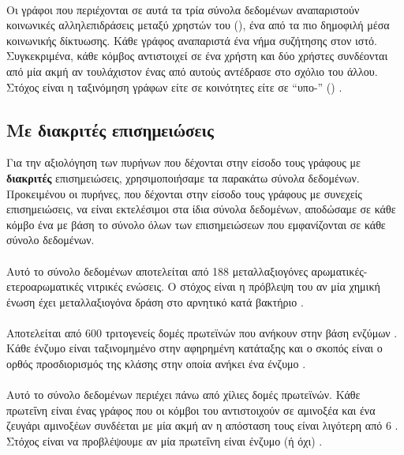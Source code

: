 \paragraph*{}
Οι γράφοι που περιέχονται σε αυτά τα τρία σύνολα δεδομένων αναπαριστούν κοινωνικές αλληλεπιδράσεις μεταξύ χρηστών του  (), ένα από τα πιο δημοφιλή μέσα κοινωνικής δίκτυωσης.
Κάθε γράφος αναπαριστά ένα νήμα συζήτησης στον ιστό.
Συγκεκριμένα, κάθε κόμβος αντιστοιχεί σε ένα χρήστη και δύο χρήστες συνδέονται από μία ακμή αν τουλάχιστον ένας από αυτούς αντέδρασε στο σχόλιο του άλλου.
Στόχος είναι η ταξινόμηση γράφων είτε σε κοινότητες είτε σε ``υπο-'' () \cite{DGK_PINAR}.

\subsection{Με διακριτές επισημειώσεις}
\label{ssec:lab}
Για την αξιολόγηση των πυρήνων που δέχονται στην είσοδο τους γράφους με \textbf{διακριτές} επισημειώσεις, χρησιμοποιήσαμε τα παρακάτω σύνολα δεδομένων.
Προκειμένου οι πυρήνες, που δέχονται στην είσοδο τους γράφους με συνεχείς επισημειώσεις, να είναι εκτελέσιμοι στα ίδια σύνολα δεδομένων, αποδώσαμε σε κάθε κόμβο ένα  με βάση το σύνολο όλων των επισημειώσεων που εμφανίζονται σε κάθε σύνολο δεδομένων.
\paragraph*{} Αυτό το σύνολο δεδομένων αποτελείται από 188 μεταλλαξιογόνες αρωματικές-ετεροαρωματικές νιτρικές ενώσεις.
Ο στόχος είναι η πρόβλεψη του αν μία χημική ένωση έχει μεταλλαξιογόνα δράση στο αρνητικό κατά  βακτήριο  \cite{shervashidze2011weisfeiler}.

\paragraph*{} Αποτελείται από $600$ τριτογενείς δομές πρωτεϊνών που ανήκουν στην βάση ενζύμων .
Κάθε ένζυμο είναι ταξινομημένο στην αφηρημένη κατάταξης  και ο σκοπός είναι ο ορθός προσδιορισμός της κλάσης στην οποία ανήκει ένα ένζυμο \cite{Borgwardt2005}.

\paragraph*{} Αυτό το σύνολο δεδομένων περιέχει πάνω από χίλιες δομές πρωτεϊνών.
Κάθε πρωτεΐνη είναι ένας γράφος που οι κόμβοι του αντιστοιχούν σε αμινοξέα και ένα ζευγάρι αμινοξέων συνδέεται με μία ακμή αν η απόσταση τους είναι λιγότερη από 6 .
Στόχος είναι να προβλέψουμε αν μία πρωτεΐνη είναι ένζυμο (ή όχι) \cite{DobsonDoig03, shervashidze2011weisfeiler}.

